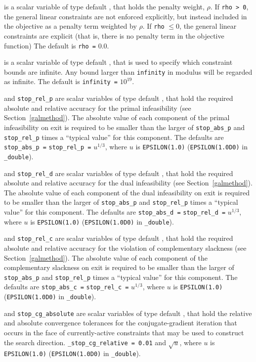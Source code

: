 \begin{description}
 is a scalar variable of type default \realdp, that holds
the penalty weight, $\rho$. If {\tt rho > 0}, the general linear constraints are
not enforced explicitly, but instead included in the objective as a penalty term
weighted by $\rho$. If {\tt rho} $\leq 0$, the general linear constraints are
explicit (that is, there is no penalty term in the objective function)
The default is {\tt rho =} $0.0$.

 is a scalar variable of type default \realdp, that is used to
specify which constraint bounds are infinite.
Any bound larger than {\tt infinity} in modulus will be regarded as infinite.
The default is {\tt infinity =} $10^{19}$.

 and {\tt stop\_rel\_p}
are scalar variables of type default \realdp, that hold the
required absolute and relative accuracy for the primal infeasibility
(see Section~\ref{galmethod}).
The absolute value of each component of the primal infeasibility
on exit is required to be smaller than the larger of {\tt stop\_abs\_p} and
{\tt stop\_rel\_p} times a ``typical value'' for this component.
The defaults are {\tt stop\_abs\_p =} {\tt stop\_rel\_p =} $u^{1/3}$,
where $u$ is {\tt EPSILON(1.0)} ({\tt EPSILON(1.0D0)} in
{\tt \fullpackagename\_double}).

 and {\tt stop\_rel\_d}
are scalar variables of type default \realdp, that hold the
required absolute and relative accuracy for the dual infeasibility
(see Section~\ref{galmethod}).
The absolute value of each component of the dual infeasibility
on exit is required to be smaller than the larger of {\tt stop\_abs\_p} and
{\tt stop\_rel\_p} times a ``typical value'' for this component.
The defaults are {\tt stop\_abs\_d =} {\tt stop\_rel\_d =} $u^{1/3}$,
where $u$ is {\tt EPSILON(1.0)} ({\tt EPSILON(1.0D0)} in
{\tt \fullpackagename\_double}).

 and {\tt stop\_rel\_c}
are scalar variables of type default \realdp, that hold the
required absolute and relative accuracy
for the violation of complementary slackness
(see Section~\ref{galmethod}).
The absolute value of each component of the complementary slackness
on exit is required to be smaller than the larger of {\tt stop\_abs\_p} and
{\tt stop\_rel\_p} times a ``typical value'' for this component.
The defaults are {\tt stop\_abs\_c =} {\tt stop\_rel\_c =} $u^{1/3}$,
where $u$ is {\tt EPSILON(1.0)} ({\tt EPSILON(1.0D0)} in
{\tt \fullpackagename\_double}).

 and {\tt stop\_cg\_absolute}
are scalar variables of type default \realdp,
that hold the relative and absolute convergence tolerances for the
conjugate-gradient iteration that occurs in the face of currently-active
constraints that may be used to construct the search direction.
{\tt \_stop\_cg\_relative = 0.01}
and  $\sqrt{u}$,
where $u$ is {\tt EPSILON(1.0)} ({\tt EPSILON(1.0D0)} in
{\tt \fullpackagename\_double}).


\end{description}

